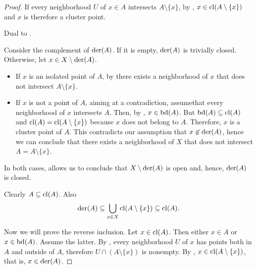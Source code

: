 \begin{proof}
   If every neighborhood \( U \) of \( x \in A \) intersects \( A \setminus \{ x \} \), by , \( x \in \operatorname{cl}(A \setminus \{ x \}) \) and \( x \) is therefore a cluster point.

   Dual to .

   Consider the complement of \( \operatorname{der}(A) \). If it is empty, \( \operatorname{der}(A) \) is trivially closed. Otherwise, let \( x \in X \setminus \operatorname{der}(A) \).

  \begin{itemize}
    \item If \( x \) is an isolated point of \( A \), by  there exists a neighborhood of \( x \) that does not intersect \( A \setminus \{ x \} \).
    \item If \( x \) is not a point of \( A \), aiming at a contradiction, assume\LEM that every neighborhood of \( x \) intersects \( A \). Then, by , \( x \in \operatorname{bd}(A) \). But \( \operatorname{bd}(A) \subseteq \operatorname{cl}(A) \) and \( \operatorname{cl}(A) = \operatorname{cl}(A \setminus \{ x \}) \) because \( x \) does not belong to \( A \). Therefore, \( x \) is a cluster point of \( A \). This contradicts our assumption that \( x \not\in \operatorname{der}(A) \), hence we can conclude that there exists a neighborhood of \( X \) that does not intersect \( A = A \setminus \{ x \} \).
  \end{itemize}

  In both cases,  allows us to conclude that \( X \setminus \operatorname{der}(A) \) is open and, hence, \( \operatorname{der}(A) \) is closed.

   Clearly \( A \subseteq \operatorname{cl}(A) \). Also
  \begin{equation*}
    \operatorname{der}(A) \subseteq \bigcup_{x \in X} \operatorname{cl}(A \setminus \{ x \}) \subseteq \operatorname{cl}(A).
  \end{equation*}

  Now we will prove the reverse inclusion. Let \( x \in \operatorname{cl}(A) \). Then either \( x \in A \) or \( x \in \operatorname{bd}(A) \). Assume the latter. By , every neighborhood \( U \) of \( x \) has points both in \( A \) and outside of \( A \), therefore \( U \cap (A \setminus \{ x \}) \) is nonempty. By , \( x \in \operatorname{cl}(A \setminus \{ x \}) \), that is, \( x \in \operatorname{der}(A) \).


\end{proof}
